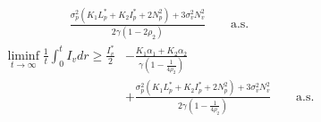 \begin{theorem}
\begin{equation}
\begin{aligned}
 					\frac{\sigma_p ^ 2
 						\left(
 							K_1 L_p ^* +
 							K_2 I_p ^* + 
 							2N_p ^ 2
 						\right) + 
 						3\sigma_v^2 N_v^2}{2\gamma(1 - 2 \rho_2)}
 						\qquad \mbox{a.s.}
		\end{aligned}
	\end{equation}
%
	\begin{equation}\label{eqn::lowerInfecVector}
		\begin{aligned}
				\liminf
				\limits_{t \to \infty}
				\frac{1}{t}
				\int_{0} ^ {t} 
					I_v 
				dr
				\geq
				\frac{I_v^*}{2}
				&- 
				    \frac{
			    	K_1 \alpha_1 + 
					K_2 \alpha_2
					}{\gamma (1 - \frac{1}{4\rho_2} )}
					\\
			&+
					\frac{\sigma_p^2
						\left(
							K_1 L_p ^* + 
							K_2 I_p ^* + 
							2N_p ^2
						\right) + 
						3 \sigma_v^2 
						N_v ^ 2}{2\gamma (1 - \frac{1}{4\rho_2} )}
				\qquad \mbox{a.s.}
 		\end{aligned}
	\end{equation}
\end{theorem}
